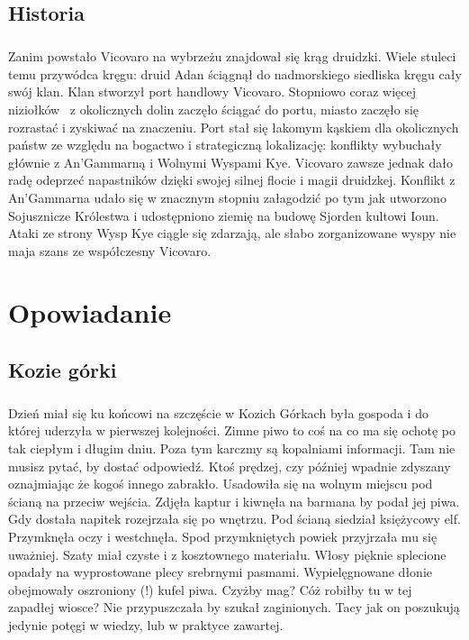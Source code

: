 \documentclass[10pt,twoside,twocolumn]{book}
\begin{document}
\section{Historia}
\paragraph{}
Zanim powstało Vicovaro na wybrzeżu znajdował się krąg druidzki. 
Wiele stuleci temu przywódca kręgu: druid Adan ściągnął do nadmorskiego siedliska kręgu cały swój klan. 
Klan stworzył port handlowy Vicovaro. 
Stopniowo coraz więcej niziołków  z okolicznych dolin zaczęło ściągać do portu, miasto zaczęło się rozrastać i zyskiwać na znaczeniu.
Port stał się łakomym kąskiem dla okolicznych państw ze względu na bogactwo i strategiczną lokalizację: konflikty wybuchały głównie z An'Gammarną i Wolnymi Wyspami Kye. 
Vicovaro zawsze jednak dało radę odeprzeć napastników dzięki swojej silnej flocie i magii druidzkej. 
Konflikt z An'Gammarna udało się w znacznym stopniu załagodzić po tym jak utworzono Sojusznicze Królestwa i udostępniono ziemię na budowę Sjorden kultowi Ioun. 
Ataki ze strony Wysp Kye ciągle się zdarzają, ale słabo zorganizowane wyspy nie maja szans ze współczesny Vicovaro.

\onecolumn
\large
\chapter{Opowiadanie}
\section*{Kozie górki}
\paragraph{}
Dzień miał się ku końcowi na szczęście w Kozich Górkach była gospoda i do której uderzyła w pierwszej kolejności.
Zimne piwo to coś na co ma się ochotę po tak ciepłym i długim dniu. 
Poza tym karczmy są kopalniami informacji. Tam nie musisz pytać, by dostać odpowiedź. 
Ktoś prędzej, czy później wpadnie zdyszany oznajmiając że kogoś innego zabrakło. 
Usadowiła się na wolnym miejscu pod ścianą na przeciw wejścia. 
Zdjęła kaptur i kiwnęła na barmana by podał jej piwa.
Gdy dostała napitek rozejrzała się po wnętrzu. 
Pod ścianą siedział księżycowy elf. 
Przymknęła oczy i westchnęła. 
Spod przymkniętych powiek przyjrzała mu się  uważniej. 
Szaty miał czyste i z kosztownego materiału. 
Włosy pięknie splecione opadały na wyprostowane plecy srebrnymi pasmami. 
Wypielęgnowane dłonie obejmowały oszroniony (!) kufel piwa. 
Czyżby mag? 
Cóż robiłby tu w tej zapadłej wiosce? 
Nie przypuszczała by szukał zaginionych. 
Tacy jak on poszukują jedynie potęgi w wiedzy, lub w praktyce zawartej.
\end{document}
